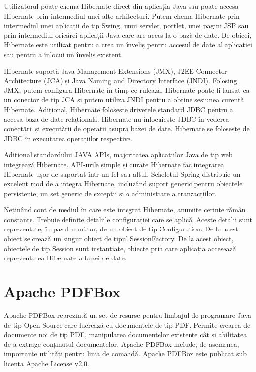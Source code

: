 \documentclass[12pt]{book}
\begin{document}
Utilizatorul poate chema Hibernate direct din aplicația Java sau poate accesa Hibernate prin intermediul unei alte arhitecturi. Putem chema Hibernate prin intermediul unei aplicații de tip Swing, unui servlet, portlet, unei pagini JSP sau prin intermediul oricărei aplicații Java care are acces la o bază de date. De obicei, Hibernate este utilizat pentru a crea un înveliș pentru accesul de date al aplicației sau pentru a înlocui un înveliș existent.

Hibernate suportă Java Management Extensions (JMX), J2EE Connector Architecture (JCA) și Java Naming and Directory Interface (JNDI). Folosing JMX, putem configura Hibernate în timp ce rulează. Hibernate poate fi lansat ca un conector de tip JCA și putem utiliza JNDI pentru a obține sesiunea curentă Hibernate. Adițional, Hibernate folosește driverele standard JDBC pentru a accesa baza de date relațională. Hibernate nu înlocuiește JDBC în vederea conectării și executării de operații asupra bazei de date. Hibernate se folosește de JDBC în executarea operațiilor respective.

Adițional standardului JAVA APIs, majoritatea aplicațiilor Java de tip web integrează Hibernate. API-urile simple și curate Hibernate fac integrarea Hibernate ușor de suportat într-un fel sau altul. Scheletul Spring distribuie un excelent mod de a integra Hibernate, incluzând suport generic pentru obiectele persistente, un set generic de excepții și o administrare a tranzacțiilor.

Neținând cont de mediul în care este integrat Hibernate, anumite cerințe rămân constante. Trebuie definite detaliile configurației care se aplică. Aceste detalii sunt reprezentate, în pasul următor, de un obiect de tip Configuration. De la acest obiect se crează un singur obiect de tipul SessionFactory. De la acest obiect, obiectele de tip Session sunt instanțiate, obiecte prin care aplicația accesează reprezentarea Hibernate a bazei de date. \cite{BeginningHibernate}

\section{Apache PDFBox}

Apache PDFBox reprezintă un set de resurse pentru limbajul de programare Java de tip Open Source care lucrează cu documentele de tip PDF. Permite crearea de documente noi de tip PDF, manipularea documentelor existente cât și abilitatea de a extrage conținutul documentelor. Apache PDFBox include, de asemenea, importante utilități pentru linia de comandă. Apache PDFBox este publicat sub licența Apache License v2.0.\cite{PDFBoxOfficial}
\end{document}
